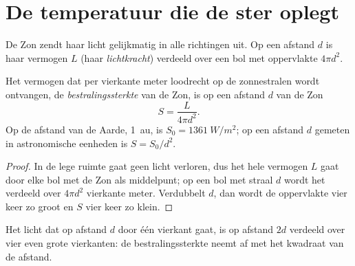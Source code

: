 \section{De temperatuur die de ster oplegt}

De Zon zendt haar licht gelijkmatig in alle richtingen uit. Op een afstand $d$
is haar vermogen $L$ (haar \emph{lichtkracht}) verdeeld over een bol met oppervlakte $4\pi d^2$.

\begin{proposition}\label{prop:g10:habitable-planet:inverse-square}
Het vermogen dat per vierkante meter loodrecht op de zonnestralen wordt
ontvangen, de \emph{bestralingssterkte} van de Zon, is op een afstand $d$ van de Zon
\[
  S = \frac{L}{4\pi d^2}.
\]
Op de afstand van de Aarde, \qty{1}{au}, is $S_0 = \qty{1361}{W/m^2}$; op een
afstand $d$ gemeten in astronomische eenheden is $S = S_0/d^2$.
\end{proposition}

\begin{proof}
In de lege ruimte gaat geen licht verloren, dus het hele vermogen $L$ gaat door
elke bol met de Zon als middelpunt; op een bol met straal $d$ wordt het verdeeld
over $4\pi d^2$ vierkante meter. Verdubbelt $d$, dan wordt de oppervlakte vier
keer zo groot en $S$ vier keer zo klein.
\end{proof}

\begin{omfigure}

{\small Het licht dat op afstand $d$ door één vierkant gaat, is op afstand $2d$
verdeeld over vier even grote vierkanten: de bestralingssterkte neemt af met
het kwadraat van de afstand.}
\end{omfigure}

